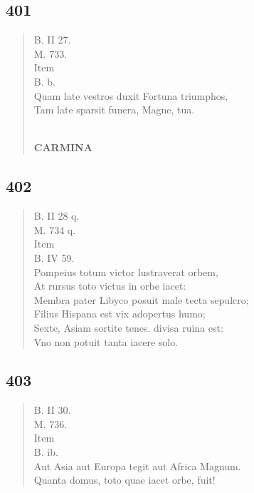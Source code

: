\documentclass[11pt, a4paper]{report}
\begin{document}
            \subsection*{401}
      \begin{verse}
      B. II 27. \\ M. 733. \\  \lbrack Item \rbrack  \\ B. b. \\ Quam late vestros duxit Fortuna triumphos, \\ Tam late sparsit funera, Magne, tua. \\ 
        ﻿\pagebreak 
    \begin{center} \textbf{CARMINA} \end{center} \marginpar{[314]} 
      \end{verse}
  
            \subsection*{402}
      \begin{verse}
      B. II 28 q. \\ M. 734 q. \\  \lbrack Item \rbrack  \\ B. IV 59. \\ Pompeius totum victor lustraverat orbem, \\ At rursus toto victus in orbe iacet: \\ Membra pater Libyco posuit male tecta sepulcro; \\ Filius Hispana est vix adopertus humo; \\ Sexte, Asiam sortite tenes. divisa ruina est: \\ Vno non potuit tanta iacere solo. \\ 
      \end{verse}
  
            \subsection*{403}
      \begin{verse}
      B. II 30. \\ M. 736. \\  \lbrack Item \rbrack  \\ B. ib. \\ Aut Asia aut Europa tegit aut Africa Magnum. \\ Quanta domus, toto quae iacet orbe, fuit! \\ 
      \end{verse}
  
\end{document}
